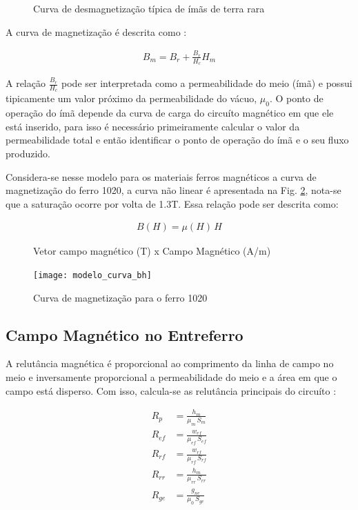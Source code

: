 \begin{figure}[!ht]
	\centering
	\def\svgwidth{0.7\columnwidth}
	
	\caption{Curva de desmagnetização típica de ímãs de terra rara}
	\label{Fig:Modelagem:circuito:passivo:ima}
\end{figure}

A curva de magnetização é descrita como :

\begin{align}
B_m = B_r + \frac{B_r}{H_c} H_m
\label{eq:p:ima}
\end{align}

A relação $\frac{B_r}{H_c}$ pode ser interpretada como a permeabilidade do meio (ímã) e possui tipicamente um valor próximo da permeabilidade do vácuo, $\mu_0$. O ponto de operação do ímã depende da curva de carga do circuíto magnético em que ele está inserido, para isso é necessário primeiramente calcular o valor da permeabilidade total e então identificar o ponto de operação do ímã e o seu fluxo produzido.

Considera-se nesse modelo para os materiais ferros magnéticos a curva de magnetização do ferro 1020, a curva não linear é apresentada na Fig. \ref{Fig:Modelagem:BH}, nota-se que a saturação ocorre por volta de 1.3T. Essa relação pode ser descrita como:

\begin{align}
B(H) = \mu(H) \, H
\label{eq:p:BH:ferro}
\end{align}

\begin{figure}[!ht]
	\centering
	\caption*{ Vetor campo magnético (T) x Campo Magnético (A/m)}
	\texttt{[image: modelo\_curva\_bh]}
	\caption{Curva de magnetização para o ferro 1020}
	\label{Fig:Modelagem:BH}
\end{figure}


\subsection{Campo Magnético no Entreferro}

A relutância magnética é proporcional ao comprimento da linha de campo no meio e inversamente proporcional a permeabilidade do meio e a área em que o campo está disperso. Com isso, calcula-se as relutância principais do circuíto :

\begin{align}
R_{p}  &= \frac{h_m}{\mu_m \, S_m}			\\
R_{ef} &= \frac{w_{ef}}{\mu_{ef}\, S_{ef}}  \\     
R_{rf} &= \frac{w_{rf}}{\mu_{rf}\, S_{rf}}   \\    
R_{rr} &= \frac{h_m}{\mu_{rr} \, S_{rr}}     \\      
R_{ge} &= \frac{g_{ne}}{\mu_0  \, S_{ge}}        
\end{align}


